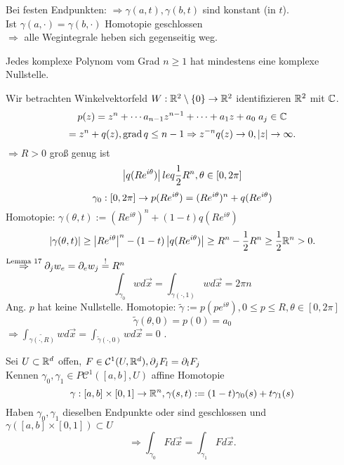 \documentclass[../ana2.tex]{subfiles}
\begin{document}
\begin{bem}
    Bei festen Endpunkten: \(\Rightarrow \gamma(a,t), \gamma(b,t) \) sind konstant (in \(t\)).\\
    Ist \(\gamma(a, \cdot) = \gamma(b, \cdot)\) Homotopie geschlossen\\
    \(\Rightarrow\) alle Wegintegrale heben sich gegenseitig weg.
\end{bem}
\begin{satz}
    Jedes komplexe Polynom vom Grad \( n \geq 1 \) hat 
    mindestens eine komplexe Nullstelle.
\end{satz}
\begin{bew}
    Wir betrachten Winkelvektorfeld \( W:\mathbb{R}^2 \setminus \{0\}\rightarrow \mathbb{R}^2 \) 
    identifizieren \( \mathbb{R}^2 \) mit \( \mathbb{C} \).
    \[ p(z) = z^n + \cdots a_{n-1} z^{n-1} + \cdots + a_1 z + a_0 \; a_j \in \mathbb{C} \]
    \[ = z^n + q(z), \operatorname{grad} q \leq n - 1 \Rightarrow z^{-n} q(z) \rightarrow 0, \left|z\right| \rightarrow \infty. \]
    \(\Rightarrow R > 0\) groß genug ist 
    \[ \left|q(Re^{i \theta}) \right| leq \frac{1}{2} R^n, \theta \in [0, 2\pi] \]
    \[ \gamma_0:[0,2\pi]\rightarrow {p(Re^{i\theta})} = (Re^{i\theta})^n + q(Re^{i\theta}) \]
    Homotopie: \( \gamma(\theta, t) := (R e^{i\theta})^n + (1-t) q (R e^{i \theta}) \)
    \[ \left| \gamma(\theta, t) \right| \geq \left| R e^{i\theta} \right|^n - (1-t) \left| q (R e^{i\theta}) \right| 
    \geq R^n - \frac{1}{2} R^n \geq \frac{1}{2} \mathbb{R}^n > 0. \]
    \( \overset{\text{Lemma 17}}{\Rightarrow} \partial_j w_e = \partial_e w_j \overset{\text{!}}{=} R^n \)
    \[ \int_{\gamma_0} w d\vec{x} = \int_{\gamma(\cdot, 1)} w d\vec{x} = 2\pi n \]
    Ang. \( p \) hat keine Nullstelle.
    Homotopie: \( \tilde{\gamma} := p(p e^{i\theta}), 0 \leq p \leq R, \theta \in [0,2\pi] \)
    \[ \tilde{\gamma}(\theta, 0) = p(0) = a_0 \]
    \( \Rightarrow \int_{\tilde{\gamma(\cdot, R)}} w d\vec{x} 
    = \int_{\tilde{\gamma}(\cdot, 0) } w d\vec{x} = 0 \) \Lightning.
\end{bew}
\begin{lem}
    Sei \(U \subset \mathbb{R}^d \) offen, \( F \in \mathcal{C}^1(U, \mathbb{R}^d), \partial_j F_l = \partial_l F_j \)\\
    Kennen \( \gamma_0, \gamma_1 \in P\mathcal{C}^1([a,b], U) \) affine Homotopie 
    \[ \gamma:[a,b] \times [0,1]\rightarrow \mathbb{R}^n, \gamma(s,t) := (1-t)\gamma_0(s) + t \gamma_1(s) \]
    Haben \(\gamma_0,\gamma_1\) dieselben Endpunkte oder sind geschlossen und 
    \(\gamma([a,b]\times[0,1]) \subset U \)
    \[ \Rightarrow \int_{\gamma_0} F d\vec{x} = \int_{\gamma_1} F d\vec{x}. \]
\end{lem}
\end{document}
